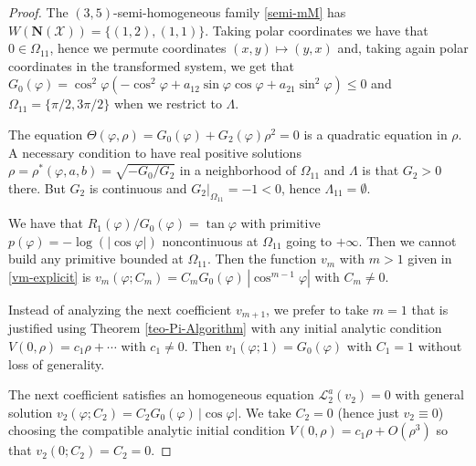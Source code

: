 \documentclass[10pt,a4paper]{amsart}
\begin{document}
\begin{proof}
The $(3, 5)$-semi-homogeneous family \eqref{semi-mM} has $W(\mathbf{N}(\mathcal{X})) = \{ (1, 2), (1, 1) \}$. Taking polar coordinates we have that $0 \in \Omega_{11}$, hence we permute coordinates $(x,y) \mapsto (y,x)$ and, taking again polar coordinates in the transformed system, we get that $G_0(\varphi) = \cos^2\varphi (- \cos^2\varphi + a_{12} \sin\varphi \cos\varphi  + a_{21} \sin^2\varphi) \leq 0$ and $\Omega_{11} = \{\pi/2, 3 \pi/2\}$ when we restrict to $\Lambda$.

The equation $\Theta(\varphi, \rho) = G_0(\varphi) + G_2(\varphi) \rho^2 = 0$ is a quadratic equation in $\rho$. A necessary condition to have real positive solutions $\rho=\rho^*(\varphi, a, b) = \sqrt{-G_0/G_2}$ in a neighborhood of $\Omega_{11}$ and $\Lambda$ is that $G_2 > 0$ there. But $G_2$ is continuous and $G_2|_{\Omega_{11}} = -1 < 0$, hence $\Lambda_{11} = \emptyset$.

We have that $R_1(\varphi)/G_0(\varphi) = \tan\varphi$ with primitive $p(\varphi) = -\log(|\cos\varphi|)$ noncontinuous at $\Omega_{11}$ going to $+ \infty$. Then we cannot build any primitive bounded at $\Omega_{11}$. Then the function $v_m$ with $m>1$ given in \eqref{vm-explicit} is $v_m(\varphi; C_m) = C_m G_0(\varphi) \, |\cos^{m-1}\varphi|$ with $C_m \neq 0$.

Instead of analyzing the next coefficient $v_{m+1}$, we prefer to take $m=1$ that is justified using Theorem \ref{teo-Pi-Algorithm} with any initial analytic condition $V(0,\rho) = c_1 \rho + \cdots$ with $c_1 \neq 0$. Then
$v_1(\varphi; 1) = G_0(\varphi)$ with $C_1 =1$ without loss of generality.


The next coefficient satisfies an homogeneous equation $\mathcal{L}^{a}_2(v_2) = 0$ with general solution $v_2(\varphi; C_2) = C_2 G_0(\varphi) \, |\cos\varphi|$. We take $C_2=0$ (hence just $v_2\equiv 0$) choosing the compatible analytic initial condition $V(0,\rho) = c_1 \rho + O(\rho^3)$ so that $v_2(0; C_2) = C_2 = 0$.


\end{proof}
\end{document}
